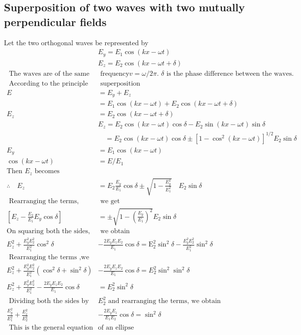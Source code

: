 \subsection{Superposition of two waves with two mutually perpendicular fields}
Let the two orthogonal waves be represented by
$$
\begin{aligned}
&E_{y}=E_{1} \cos (k x-\omega t) \\
&E_{z}=E_{2} \cos (k x-\omega t+\delta)\\
\text { The waves are of the same}&\text{ frequency} v=\omega / 2 \pi \text {. } \delta \text { is the phase difference between the waves. }\\
\text{ According to the principle of}&\text{ superposition}\\
E &=E_{y}+E_{z} \\
&=E_{1} \cos (k x-\omega t)+E_{2} \cos (k x-\omega t+\delta)\\
E_{z}&=E_{2} \cos (k x-\omega t+\delta)\\
	&E_{z}=E_{2} \cos (k x-\omega t) \cos \delta-E_{2} \sin (k x-\omega t) \sin \delta \\
&\quad=E_{2} \cos (k x-\omega t) \cos \delta \pm\left[1-\cos ^{2}(k x-\omega t)\right]^{1 / 2} E_{2} \sin \delta\\
E_{y}&=E_{1} \cos (k x-\omega t)\\
 \cos (k x-\omega t)&=E / E_{1}\\
 \text{Then $E_z$ becomes}\\
 \therefore \quad E_{z}&=E_{2} \frac{E_{y}}{E_{1}} \cos \delta \pm \sqrt{1-\frac{E_{y}^{2}}{E_{1}^{2}}} \quad E_{2} \sin \delta\\
\text{ Rearranging the terms,}&\text{ we get }\\
 \left[E_{z}-\frac{E_{2}}{E_{1}} E_{y} \cos \delta\right]&=\pm \sqrt{1-\left(\frac{E_{y}}{E_{1}}\right)^{2}} E_{2} \sin \delta\\
 \text{On squaring both the sides,}&\text{ we obtain}\\
 E_{z}^{2}+\frac{E_{y}^{2} E_{2}^{2}}{E_{1}^{2}} \cos ^{2} \delta&-\frac{2 E_{y} E_{z} E_{2}}{E_{1}} \cos \delta=\mathrm{E}_{2}^{2} \sin ^{2} \delta-\frac{E_{y}^{2} E_{2}^{2}}{E_{1}^{2}} \sin ^{2} \delta \\
\text{ Rearranging the terms ,we get}\\
 E_z^2+\frac{E_y^2E_2^2}{E_1^2}\left( \cos^2\delta+\sin^2\delta\right) &-\frac{2E_yE_zE_2}{E_1}\cos\delta=E_2^2\sin^2\sin^2\delta\\
 E_{z}^{2}+\frac{E_{y}^{2} E_{2}^{2}}{E_{1}^{2}}-\frac{2 E_{y} E_{z} E_{2}}{E_{1}} \cos \delta&=E_{2}^{2} \sin ^{2} \delta\\
\text{ Dividing both the sides by }&\text{$E_{2}^{2}$ and rearranging the terms, we obtain}\\
 \frac{E_{y}^{2}}{E_{1}^{2}}+\frac{E_{z}^{2}}{E_{2}^{2}}&-\frac{2 E_{y} E_{z}}{E_{1} E_{2}} \cos \delta=\sin ^{2} \delta\\
\text{ This is the general equation }&\text{of an ellipse}
\end{aligned}
$$

